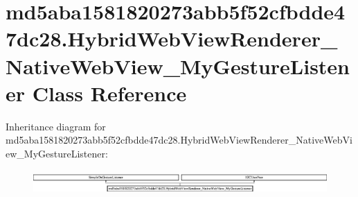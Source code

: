 \hypertarget{classmd5aba1581820273abb5f52cfbdde47dc28_1_1HybridWebViewRenderer__NativeWebView__MyGestureListener}{}\section{md5aba1581820273abb5f52cfbdde47dc28.\+Hybrid\+Web\+View\+Renderer\+\_\+\+Native\+Web\+View\+\_\+\+My\+Gesture\+Listener Class Reference}
\label{classmd5aba1581820273abb5f52cfbdde47dc28_1_1HybridWebViewRenderer__NativeWebView__MyGestureListener}
Inheritance diagram for md5aba1581820273abb5f52cfbdde47dc28.\+Hybrid\+Web\+View\+Renderer\+\_\+\+Native\+Web\+View\+\_\+\+My\+Gesture\+Listener\+:\begin{figure}[H]
\begin{center}
\leavevmode
\includegraphics[height=0.904685cm]{classmd5aba1581820273abb5f52cfbdde47dc28_1_1HybridWebViewRenderer__NativeWebView__MyGestureListener}
\end{center}
\end{figure}
